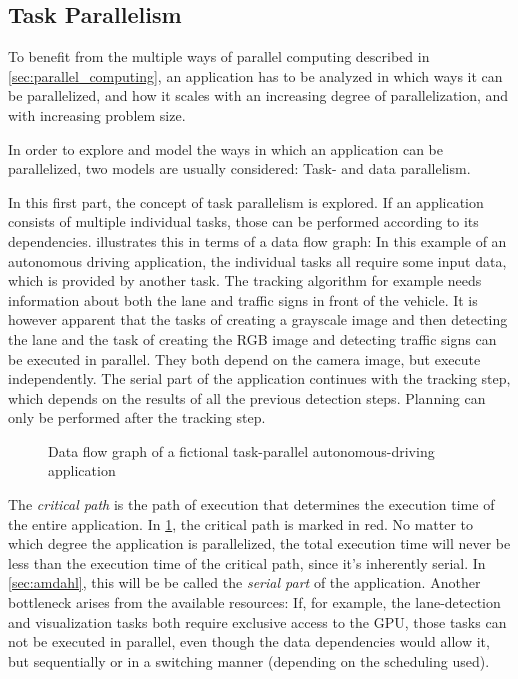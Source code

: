 \documentclass[BCOR20mm,DIV14,10pt,headinclude,footexclude,bibtotoc,liststotoc]{article}
\begin{document}
\subsection{Task Parallelism}
\label{sec:task_parallel}
To benefit from the multiple ways of parallel computing described in
\cref{sec:parallel_computing}, an application has to be analyzed in which ways
it can be parallelized, and how it scales with an increasing degree of
parallelization, and with increasing problem size.

In order to explore and model the ways in which an application can be
parallelized, two models are usually considered: Task- and data parallelism.

In this first part, the concept of task parallelism is explored. If an
application consists of multiple individual tasks, those can be performed
according to its dependencies.  illustrates this in terms
of a data flow graph: In this example of an autonomous driving application, the
individual tasks all require some input data, which is provided by another task.
The tracking algorithm for example needs information about both the lane and
traffic signs in front of the vehicle. It is however apparent that the tasks of
creating a grayscale image and then detecting the lane and the task of creating
the RGB image and detecting traffic signs can be executed in parallel. They both
depend on the camera image, but execute independently. The serial part of the
application continues with the tracking step, which depends on the results of
all the previous detection steps. Planning can only be performed after the
tracking step.

\begin{figure}
	\centering
	
	\caption{Data flow graph of a fictional task-parallel autonomous-driving application}
	\label{fig:task_graph}
\end{figure}

The \emph{critical path} is the path of execution that determines the execution
time of the entire application. In \cref{fig:task_graph}, the critical path is
marked in red. No matter to which degree the application is parallelized, the
total execution time will never be less than the execution time of the critical
path, since it's inherently serial. In \cref{sec:amdahl}, this will be be called
the \emph{serial part} of the application. Another bottleneck arises from the
available resources: If, for example, the lane-detection and visualization tasks
both require exclusive access to the GPU, those tasks can not be executed in
parallel, even though the data dependencies would allow it, but sequentially or
in a switching manner (depending on the scheduling used).
\end{document}
